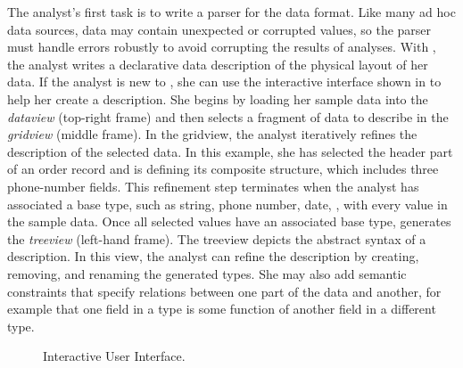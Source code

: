 
The analyst's first task is to write a parser for the \dibbler{} data
format.  Like many ad hoc data sources, \dibbler{} data may contain
unexpected or corrupted values, so the parser must handle errors
robustly to avoid corrupting the results of analyses.  With \pads{},
the analyst writes a declarative data description of the physical
layout of her data.  If the analyst is new to \pads{}, she can use the
\launchpads{} interactive interface shown in
 to help her create a \pads{} description.
She begins by loading her sample data into the {\it dataview}
(top-right frame) and then selects a fragment of data to describe in
the {\it gridview} (middle frame).  In the gridview, the analyst
iteratively refines the description of the selected data.  In this
example, she has selected the header part of an order record and
is defining its composite structure, which includes three phone-number fields.
This refinement step terminates when the analyst has associated a base
type, such as string, phone number, date, \etc{}, with every value in
the sample data.  Once all selected values have an associated base
type, \textsc{\launchpads{}} generates the {\it treeview} (left-hand
frame).  The treeview depicts the abstract syntax of a \pads{}
description.  In this view, the analyst can refine the description by
creating, removing, and renaming the generated types.  She may also
add semantic constraints that specify relations between one part of
the data and another, for example that one field in a type is some
function of another field in a different type.
\begin{figure}
  \begin{center}
  \end{center}
\caption{\label{figure:launchpads}\launchpads{} Interactive User Interface.\vspace{-1cm}}
\end{figure}

